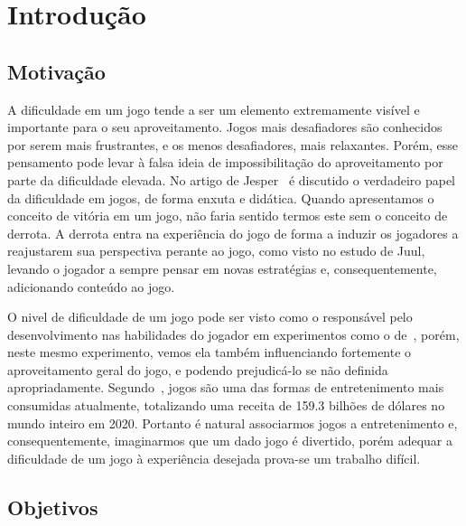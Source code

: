 
\chapter{Introdução}
\label{cap:introducao}
\section{Motivação}

A dificuldade em um jogo tende a ser um elemento extremamente visível e importante para o seu aproveitamento. Jogos mais desafiadores são conhecidos por serem mais frustrantes, e os menos desafiadores, mais relaxantes. Porém, esse pensamento pode levar à falsa ideia de impossibilitação do aproveitamento por parte da dificuldade elevada. No artigo de Jesper~\citet{FearOfFailing} é discutido o verdadeiro papel da dificuldade em jogos, de forma enxuta e didática. Quando apresentamos o conceito de vitória em um jogo, não faria sentido termos este sem o conceito de derrota. A derrota entra na experiência do jogo de forma a induzir os jogadores a reajustarem sua perspectiva perante ao jogo, como visto no estudo de Juul, levando o jogador a sempre pensar em novas estratégias e, consequentemente, adicionando conteúdo ao jogo.

O nivel de dificuldade de um jogo pode ser visto como o responsável pelo desenvolvimento nas habilidades do jogador em experimentos como o de~\citet{ExperimentalValidation}, porém, neste mesmo experimento, vemos ela também influenciando fortemente o aproveitamento geral do jogo, e podendo prejudicá-lo se não definida apropriadamente. Segundo~\citet{VideoGameBusiness}, jogos são uma das formas de entretenimento mais consumidas atualmente, totalizando uma receita de 159.3 bilhões de dólares no mundo inteiro em 2020. Portanto é natural associarmos jogos a entretenimento e, consequentemente, imaginarmos que um dado jogo é divertido, porém adequar a dificuldade de um jogo à experiência desejada prova-se um trabalho difícil.

\section{Objetivos}

